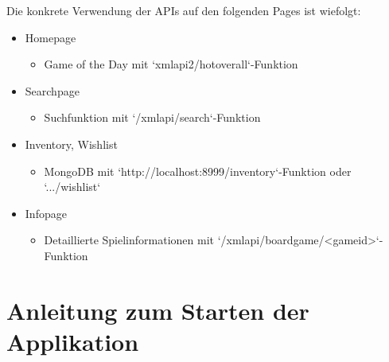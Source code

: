 Die konkrete Verwendung der APIs auf den folgenden Pages ist wiefolgt:

\begin{itemize}
    \setlength{\itemsep}{-1pt}
    \setlength{\parskip}{-1pt}
    \item Homepage
        \begin{itemize}
        \item Game of the Day mit `xmlapi2/hotoverall`-Funktion
        \end{itemize}
    \item Searchpage
        \begin{itemize}
        \item Suchfunktion mit `/xmlapi/search`-Funktion
        \end{itemize}
    \item Inventory, Wishlist
        \begin{itemize}
        \item MongoDB mit `http://localhost:8999/inventory`-Funktion oder `.../wishlist` 
        \end{itemize}
    \item Infopage
    \begin{itemize}
    \item Detaillierte Spielinformationen mit `/xmlapi/boardgame/<gameid>`-Funktion 
    \end{itemize}

\end{itemize}

\section{Anleitung zum Starten der Applikation}
